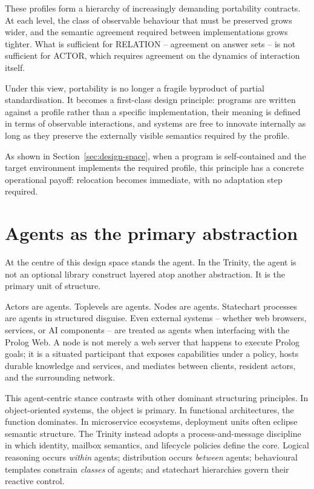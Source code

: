 \noindent These profiles form a hierarchy of increasingly demanding
portability contracts. At each level, the class of observable behaviour
that must be preserved grows wider, and the semantic agreement required
between implementations grows tighter. What is sufficient for RELATION
-- agreement on answer sets -- is not sufficient for ACTOR, which
requires agreement on the dynamics of interaction itself.

Under this view, portability is no longer a fragile byproduct of partial
standardisation. It becomes a first-class design principle: programs are
written against a profile rather than a specific implementation, their
meaning is defined in terms of observable interactions, and systems are
free to innovate internally as long as they preserve the externally
visible semantics required by the profile.

As shown in Section~\ref{sec:design-space}, when a program is self-contained and the target environment implements the required profile, this principle has a concrete operational payoff: relocation becomes immediate, with no adaptation step required.


\section{Agents as the primary abstraction}\label{sec:paradigm-agents}

At the centre of this design space stands the agent. In the Trinity,
the agent is not an optional library construct layered atop another
abstraction. It is the primary unit of structure.

Actors are agents. Toplevels are agents. Nodes are agents. Statechart
processes are agents in structured disguise. Even external systems --
whether web browsers, services, or AI components -- are treated as
agents when interfacing with the Prolog Web. A node is not merely a
web server that happens to execute Prolog goals; it is a situated
participant that exposes capabilities under a policy, hosts durable
knowledge and services, and mediates between clients, resident actors,
and the surrounding network.

This agent-centric stance contrasts with other dominant structuring
principles. In object-oriented systems, the object is primary. In
functional architectures, the function dominates. In microservice
ecosystems, deployment units often eclipse semantic structure. The
Trinity instead adopts a process-and-message discipline in which
identity, mailbox semantics, and lifecycle policies define the core.
Logical reasoning occurs \emph{within} agents; distribution occurs
\emph{between} agents; behavioural templates constrain \emph{classes} of
agents; and statechart hierarchies govern their reactive control.


